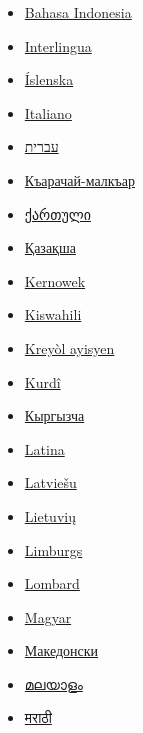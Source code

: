 \documentclass[
]{article}
\begin{document}
\begin{itemize}
\item
  \href{https://id.wikipedia.org/wiki/Joule}{{Bahasa Indonesia}}
\item
  \href{https://ia.wikipedia.org/wiki/Joule}{{Interlingua}}
\item
  \href{https://is.wikipedia.org/wiki/J\%C3\%BAl}{{Íslenska}}
\item
  \href{https://it.wikipedia.org/wiki/Joule}{{Italiano}}
\item
  \href{https://he.wikipedia.org/wiki/\%D7\%92\%27\%D7\%95\%D7\%9C}{{עברית}}
\item
  \href{https://krc.wikipedia.org/wiki/\%D0\%94\%D0\%B6\%D0\%BE\%D1\%83\%D0\%BB\%D1\%8C}{{Къарачай-малкъар}}
\item
  \href{https://ka.wikipedia.org/wiki/\%E1\%83\%AF\%E1\%83\%9D\%E1\%83\%A3\%E1\%83\%9A\%E1\%83\%98}{{ქართული}}
\item
  \href{https://kk.wikipedia.org/wiki/\%D0\%94\%D0\%B6\%D0\%BE\%D1\%83\%D0\%BB\%D1\%8C}{{Қазақша}}
\item
  \href{https://kw.wikipedia.org/wiki/Joule}{{Kernowek}}
\item
  \href{https://sw.wikipedia.org/wiki/Jouli}{{Kiswahili}}
\item
  \href{https://ht.wikipedia.org/wiki/Joul}{{Kreyòl ayisyen}}
\item
  \href{https://ku.wikipedia.org/wiki/Joule}{{Kurdî}}
\item
  \href{https://ky.wikipedia.org/wiki/\%D0\%92\%D0\%B0\%D1\%82\%D1\%82-\%D1\%81\%D0\%B5\%D0\%BA\%D1\%83\%D0\%BD\%D0\%B4\%D0\%B0}{{Кыргызча}}
\item
  \href{https://la.wikipedia.org/wiki/Joulium}{{Latina}}
\item
  \href{https://lv.wikipedia.org/wiki/D\%C5\%BEouls}{{Latviešu}}
\item
  \href{https://lt.wikipedia.org/wiki/D\%C5\%BEaulis}{{Lietuvių}}
\item
  \href{https://li.wikipedia.org/wiki/Joule}{{Limburgs}}
\item
  \href{https://lmo.wikipedia.org/wiki/Joule}{{Lombard}}
\item
  \href{https://hu.wikipedia.org/wiki/Joule}{{Magyar}}
\item
  \href{https://mk.wikipedia.org/wiki/\%D0\%8F\%D1\%83\%D0\%BB}{{Македонски}}
\item
  \href{https://ml.wikipedia.org/wiki/\%E0\%B4\%9C\%E0\%B5\%82\%E0\%B5\%BE}{{മലയാളം}}
\item
  \href{https://mr.wikipedia.org/wiki/\%E0\%A4\%9C\%E0\%A5\%8D\%E0\%A4\%AF\%E0\%A5\%82\%E0\%A4\%B2}{{मराठी}}

\end{itemize}
\end{document}
